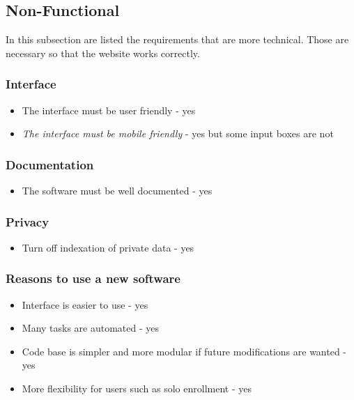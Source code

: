 \documentclass[a4paper, 12pt]{article}
\begin{document}
\subsection*{Non-Functional}
In this subsection are listed the requirements that are more technical. Those are necessary so that the website works correctly. 

\subsubsection*{Interface}
	
	\begin{itemize}
		\item The interface must be user friendly - yes
		\item \textit{The interface must be mobile friendly} - yes but some input boxes are not
	\end{itemize}

\subsubsection*{Documentation}
	
	\begin{itemize}
		\item The software must be well documented - yes
	\end{itemize}
	
\subsubsection*{Privacy}
    
    \begin{itemize}
    	\item Turn off indexation of private data - yes
    \end{itemize}



\subsubsection*{Reasons to use a new software}


	\begin{itemize}
		\item Interface is easier to use - yes
		\item Many tasks are automated - yes
		\item Code base is simpler and more modular if future modifications are wanted - yes
		\item More flexibility for users such as solo enrollment - yes
	\end{itemize}
\end{document}
